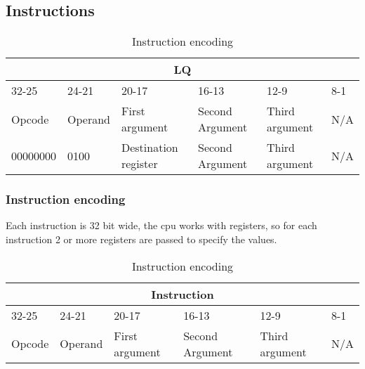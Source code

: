 \documentclass{article}
\begin{document}
\subsection{Instructions}
\begin{table}[h!]
\centering
\begin{tabular} { | p{2cm} | | p{2cm} | p{3cm} | | p{3cm} | | p{3cm}| | p{3cm} |}
  \hline
  \multicolumn{6}{|c|}{LQ}\\
  \hline
  32-25 & 24-21 & 20-17 & 16-13 & 12-9 & 8-1\\
  \hline
  Opcode & Operand & First argument & Second Argument & Third argument & N/A\\
  00000000 & 0100 & Destination register & Second Argument & Third argument & N/A\\
  \hline
\end{tabular}
\caption{Instruction encoding}
\end{table}

\subsubsection{Instruction encoding}
Each instruction is 32 bit wide, the cpu works with registers, so for each instruction 2 or more registers are passed to specify the values.
\begin{table}[h!]
\centering
\begin{tabular} { | p{2cm} | | p{2cm} | p{3cm} | | p{3cm} | | p{3cm}| | p{3cm} |}
  \hline
  \multicolumn{6}{|c|}{Instruction}\\
  \hline
  32-25 & 24-21 & 20-17 & 16-13 & 12-9 & 8-1\\
  \hline
  Opcode & Operand & First argument & Second Argument & Third argument & N/A\\
  \hline
\end{tabular}
\caption{Instruction encoding}
\end{table}
\end{document}
